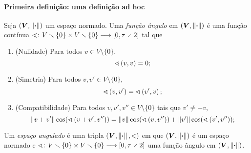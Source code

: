 \paragraph{Primeira definição: uma definição ad hoc}

\begin{definition}
Seja $(\bm V, \left\Vert{\bm{\cdot}}\right\Vert)$ um espaço normado. Uma \emph{função ângulo} em $(\bm V, \left\Vert{\bm{\cdot}}\right\Vert)$ é uma função contínua $\fun{\angf}{V \setminus \{0\} \times V \setminus \{0\}}{\intff{0}{\tau \div 2}}$ tal que
	\begin{enumerate}
		\item (Nulidade) Para todos $v \in V \setminus \{0\}$,
			\begin{equation*}
				\sphericalangle\left({v},{v}\right) = 0;
			\end{equation*}
		\item (Simetria) Para todos $v,v' \in V \setminus \{0\}$,
			\begin{equation*}
				\sphericalangle\left({v},{v'}\right) = \sphericalangle\left({v'},{v}\right);
			\end{equation*}
		\item (Compatibilidade) Para todos $v,v',v'' \in V \setminus \{0\}$ tais que $v' \neq -v$,
			\begin{equation*}
				\left\Vert{v+v'}\right\Vert\cos(\sphericalangle\left({v+v'},{v''}\right)) = \left\Vert{v}\right\Vert\cos(\sphericalangle\left({v},{v''}\right)) + \left\Vert{v'}\right\Vert\cos(\sphericalangle\left({v'},{v''}\right));
			\end{equation*}
	\end{enumerate}
Um \emph{espaço angulado} é uma tripla $(\bm V, \left\Vert{\bm{\cdot}}\right\Vert,\sphericalangle)$ em que $(\bm V, \left\Vert{\bm{\cdot}}\right\Vert)$ é um espaço normado e $\fun{\angf}{V \setminus \{0\} \times V \setminus \{0\}}{\intff{0}{\tau \div 2}}$ uma função ângulo em $(\bm V, \left\Vert{\bm{\cdot}}\right\Vert)$.
\end{definition}

